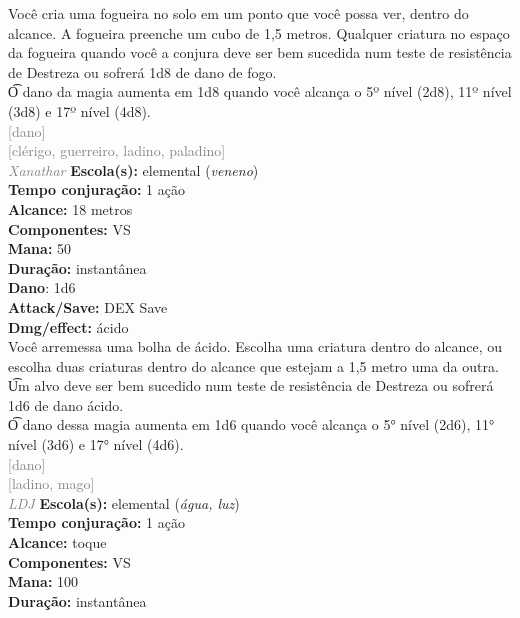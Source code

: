 \documentclass{RPG_Adventure}[2021/10/20]
\begin{document}
{\normalsize Você cria uma fogueira no solo em um ponto que você possa ver, dentro do alcance. A fogueira preenche um cubo de 1,5 metros. Qualquer criatura no espaço da fogueira quando você a conjura deve ser bem sucedida num teste de resistência de Destreza ou sofrerá 1d8 de dano de fogo.\\\t O dano da magia aumenta em 1d8 quando você alcança o 5º nível (2d8), 11º nível (3d8) e 17º nível (4d8).\\}
{\scriptsize \textcolor{gray}{[dano]\\}}
{\scriptsize \textcolor{gray}{[clérigo, guerreiro, ladino, paladino]\\}}
{\tiny \textcolor{gray}{\textit{Xanathar}}}
{\small \t \textbf{Escola(s):} elemental (\textit{veneno})\\\t \textbf{Tempo conjuração:} 1 ação\\\t \textbf{Alcance:} 18 metros\\\t \textbf{Componentes:} VS\\\t \textbf{Mana:} 50\\\t \textbf{Duração:} instantânea\\\t \textbf{Dano}: 1d6\\\t \textbf{Attack/Save:} DEX Save\\\t \textbf{Dmg/effect:} ácido\\}
{\normalsize Você arremessa uma bolha de ácido. Escolha uma criatura dentro do alcance, ou escolha duas criaturas dentro do alcance que estejam a 1,5 metro uma da outra.\\\t Um alvo deve ser bem sucedido num teste de resistência de Destreza ou sofrerá 1d6 de dano ácido.\\\t O dano dessa magia aumenta em 1d6 quando você alcança o 5° nível (2d6), 11° nível (3d6) e 17° nível (4d6).\\}
{\scriptsize \textcolor{gray}{[dano]\\}}
{\scriptsize \textcolor{gray}{[ladino, mago]\\}}
{\tiny \textcolor{gray}{\textit{LDJ}}}
{\small \t \textbf{Escola(s):} elemental (\textit{água, luz})\\\t \textbf{Tempo conjuração:} 1 ação\\\t \textbf{Alcance:} toque\\\t \textbf{Componentes:} VS\\\t \textbf{Mana:} 100\\\t \textbf{Duração:} instantânea\\}
\end{document}
